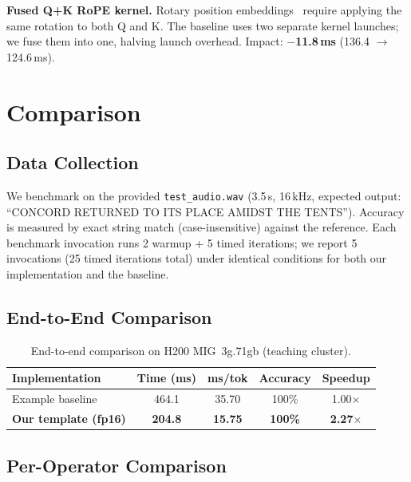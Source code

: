 \documentclass{article}
\begin{document}
\textbf{Fused Q+K RoPE kernel.}
Rotary position embeddings~\citep{su2024roformer} require applying the same rotation to both Q and K.  The baseline uses two separate kernel launches; we fuse them into one, halving launch overhead.  Impact: \textbf{$-$11.8\,ms} (136.4 $\to$ 124.6\,ms).


\section{Comparison}\label{sec:comparison}

\subsection{Data Collection}

We benchmark on the provided \texttt{test\_audio.wav} (3.5\,s, 16\,kHz, expected output: ``CONCORD RETURNED TO ITS PLACE AMIDST THE TENTS'').  Accuracy is measured by exact string match (case-insensitive) against the reference.  Each benchmark invocation runs 2 warmup + 5 timed iterations; we report 5 invocations (25 timed iterations total) under identical conditions for both our implementation and the baseline.

\subsection{End-to-End Comparison}

\begin{table}[h]
\centering
\caption{End-to-end comparison on H200 MIG~3g.71gb (teaching cluster).}
\label{tab:comparison}
\small
\begin{tabular}{@{}lcccc@{}}
\toprule
\textbf{Implementation} & \textbf{Time (ms)} & \textbf{ms/tok} & \textbf{Accuracy} & \textbf{Speedup} \\
\midrule
Example baseline & 464.1 & 35.70 & 100\% & 1.00$\times$ \\
\textbf{Our template (fp16)} & \textbf{204.8} & \textbf{15.75} & \textbf{100\%} & \textbf{2.27$\times$} \\
\bottomrule
\end{tabular}
\end{table}

\subsection{Per-Operator Comparison}
\end{document}
